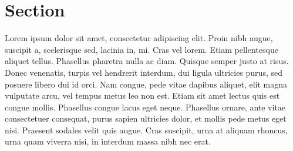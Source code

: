 \section{Section}
Lorem ipsum dolor sit amet, consectetur adipiscing elit. 
Proin nibh augue, suscipit a, scelerisque sed, lacinia in, mi. 
Cras vel lorem. Etiam pellentesque aliquet tellus. Phasellus pharetra 
nulla ac diam. Quisque semper justo at risus. 
Donec venenatis, turpis vel hendrerit interdum, dui ligula ultricies purus, 
sed posuere libero dui id orci. Nam congue, pede vitae dapibus aliquet, 
elit magna vulputate arcu, vel tempus metus leo non est. 
Etiam sit amet lectus quis est congue mollis. 
Phasellus congue lacus eget neque. 
Phasellus ornare, ante vitae consectetuer consequat, purus sapien 
ultricies dolor, et mollis pede metus eget nisi. 
Praesent sodales velit quis augue. Cras suscipit, urna at aliquam rhoncus, 
urna quam viverra nisi, in interdum massa nibh nec erat.



